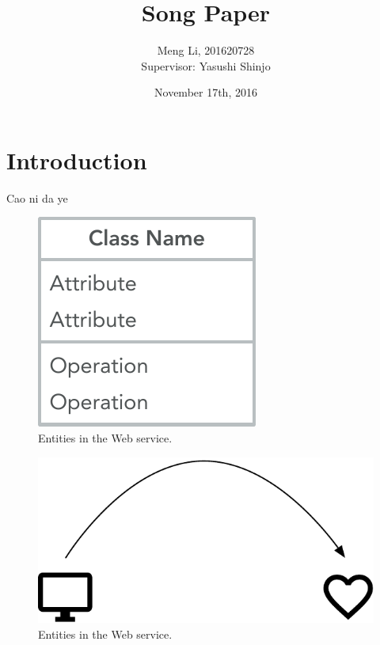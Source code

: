 \documentclass[twocolumn,10pt]{article}
\begin{document}
	
\date{November 17th, 2016}

\title{\bf Song Paper}

\author{
	Meng Li, 201620728  
	\\ Supervisor: Yasushi Shinjo
}

\maketitle

\section{Introduction}
Cao ni da ye\cite{dong2016aggregate}

\begin{figure}[t]
	\centering
	\includegraphics[scale=0.5]{1}
	\caption{Entities in the Web service.}
\end{figure}

\begin{figure}[t]
	\centering
	\includegraphics[scale=0.5]{3}
	\caption{Entities in the Web service.}
\end{figure}
\end{document}
